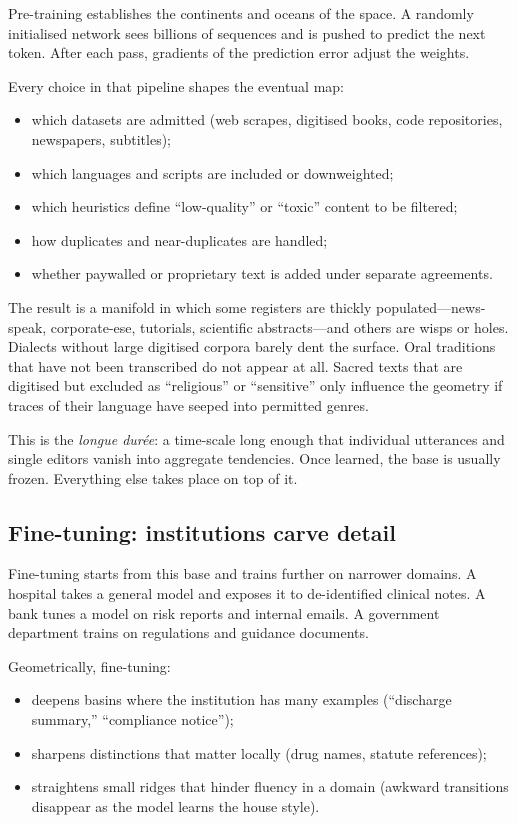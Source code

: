 Pre-training establishes the continents and oceans of the space. A randomly initialised network sees billions of sequences and is pushed to predict the next token. After each pass, gradients of the prediction error adjust the weights.

Every choice in that pipeline shapes the eventual map:

\begin{itemize}
  \item which datasets are admitted (web scrapes, digitised books, code repositories, newspapers, subtitles);
  \item which languages and scripts are included or downweighted;
  \item which heuristics define ``low-quality'' or ``toxic'' content to be filtered;
  \item how duplicates and near-duplicates are handled;
  \item whether paywalled or proprietary text is added under separate agreements.
\end{itemize}

The result is a manifold in which some registers are thickly populated---news-speak, corporate-ese, tutorials, scientific abstracts---and others are wisps or holes. Dialects without large digitised corpora barely dent the surface. Oral traditions that have not been transcribed do not appear at all. Sacred texts that are digitised but excluded as ``religious'' or ``sensitive'' only influence the geometry if traces of their language have seeped into permitted genres.

This is the \emph{longue dur\'{e}e}: a time-scale long enough that individual utterances and single editors vanish into aggregate tendencies. Once learned, the base is usually frozen. Everything else takes place on top of it.

\subsection*{Fine-tuning: institutions carve detail}

Fine-tuning starts from this base and trains further on narrower domains. A hospital takes a general model and exposes it to de-identified clinical notes. A bank tunes a model on risk reports and internal emails. A government department trains on regulations and guidance documents.

Geometrically, fine-tuning:

\begin{itemize}
  \item deepens basins where the institution has many examples (``discharge summary,'' ``compliance notice'');
  \item sharpens distinctions that matter locally (drug names, statute references);
  \item straightens small ridges that hinder fluency in a domain (awkward transitions disappear as the model learns the house style).
\end{itemize}

